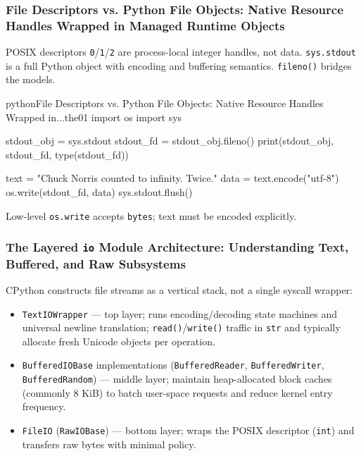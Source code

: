 \documentclass[a4paper,twoside]{report}
\begin{document}
\subsubsection{File Descriptors vs. Python File Objects: Native Resource Handles Wrapped in Managed Runtime Objects}

POSIX descriptors \texttt{0}/\texttt{1}/\texttt{2} are process-local integer handles, not data. \texttt{sys.stdout} is a full Python object with encoding and buffering semantics. \texttt{fileno()} bridges the models.

\begin{codebox}[]{python}{File Descriptors vs. Python File Objects: Native Resource Handles Wrapped in...}{the01}
import os
import sys

stdout_obj = sys.stdout
stdout_fd = stdout_obj.fileno()
print(stdout_obj, stdout_fd, type(stdout_fd))

text = "Chuck Norris counted to infinity. Twice.\n"
data = text.encode("utf-8")
os.write(stdout_fd, data)
sys.stdout.flush()
\end{codebox}


Low-level \texttt{os.write} accepts \texttt{bytes}; text must be encoded explicitly.

\subsubsection{The Layered \texttt{io} Module Architecture: Understanding Text, Buffered, and Raw Subsystems}

CPython constructs file streams as a vertical stack, not a single syscall wrapper:

\begin{itemize}
    \item \texttt{TextIOWrapper} --- top layer; runs encoding/decoding state machines and universal newline translation; \texttt{read()}/\texttt{write()} traffic in \texttt{str} and typically allocate fresh Unicode objects per operation.
    \item \texttt{BufferedIOBase} implementations (\texttt{BufferedReader}, \texttt{BufferedWriter}, \texttt{BufferedRandom}) --- middle layer; maintain heap-allocated block caches (commonly 8 KiB) to batch user-space requests and reduce kernel entry frequency.
    \item \texttt{FileIO} (\texttt{RawIOBase}) --- bottom layer; wraps the POSIX descriptor (\texttt{int}) and transfers raw bytes with minimal policy.
\end{itemize}
\end{document}
